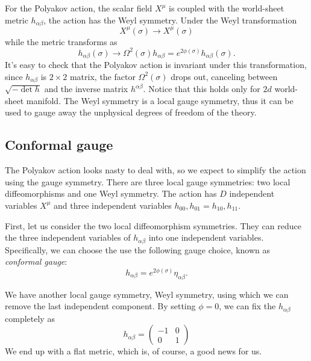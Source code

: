 \documentclass[graybox,envcountchap,sectrefs]{svmono}
\begin{document}
\begin{itemize}
For the Polyakov action, the scalar field $X^{\mu}$ is coupled with the world-sheet metric $h_{\alpha\beta}$, the action has the Weyl symmetry.
Under the Weyl transformation
\begin{equation}
X^{\mu}(\sigma)\to	X^{\mu}(\sigma)
\end{equation}
while the metric transforms as
\begin{equation}
h_{\alpha\beta}(\sigma)\to \Omega^2(\sigma)h_{\alpha\beta}=e^{2\phi(\sigma)}h_{\alpha\beta}(\sigma).	
\end{equation}
It's easy to check that the Polyakov action is invariant under this transformation, since $h_{\alpha\beta}$ is $2\times 2$ matrix, the factor $\Omega^2(\sigma)$ drops out, canceling between $\sqrt{-\det h}$ and the inverse matrix $h^{\alpha\beta}$. Notice that this holds only for $2d$ world-sheet manifold. The Weyl symmetry is a local gauge symmetry, thus it can be used to gauge away the unphysical degrees of freedom of the theory.
\end{itemize}
 


\subsection{Conformal gauge}
The Polyakov action looks nasty to deal with, so we expect to simplify the action using the gauge symmetry. There are three local gauge symmetries: two local diffeomorphisms and one Weyl symmetry. The action has $D$ independent variables $X^{\mu}$ and three independent variables $h_{00},h_{01}=h_{10},h_{11}$.


First, let us consider the two local diffeomorphism symmetries. They can reduce the three independent variables of $h_{\alpha\beta}$ into one independent variables. Specifically, we can choose the use the following gauge choice, known as \emph{conformal gauge}:
\begin{equation}
h_{\alpha\beta}=e^{2\phi(\sigma)}\eta_{\alpha\beta}.
\end{equation}

We have another local gauge symmetry, Weyl symmetry, using which we can remove the last independent component. By setting $\phi=0$, we can fix the $h_{\alpha \beta}$ completely as
\begin{equation}
h_{\alpha \beta}=\left(\begin{array}{cc}
-1 & 0 \\
0 & 1
\end{array}\right)
\end{equation}
We end up with a flat metric, which is, of course, a good news for us.
\end{document}

